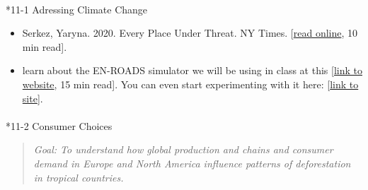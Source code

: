 \documentclass[
  10pt,
  letterpaper,
  oneside,
  open=any]{scrbook}
\makeatletter
\let\oldparagraph\paragraph
\renewcommand{\paragraph}{
    \@ifstar
      \xxxParagraphStar
      \xxxParagraphNoStar
  }
\newcommand{\xxxParagraphStar}[1]{\oldparagraph*{#1}\mbox{}}
\newcommand{\xxxParagraphNoStar}[1]{\oldparagraph{#1}\mbox{}}
\makeatother
\begin{document}

\paragraph*{11-1 Adressing Climate
Change}\label{adressing-climate-change}

\begin{itemize}
\item
  Serkez, Yaryna. 2020. Every Place Under Threat. NY Times.
  {[}\href{https://www.nytimes.com/interactive/2020/10/02/opinion/amazon-under-threat.html}{read
  online}, 10 min read{]}.
\item
  learn about the EN-ROADS simulator we will be using in class at this
  {[}\href{https://www.climateinteractive.org/en-roads/}{link to
  website}, 15 min read{]}. You can even start experimenting with it
  here:
  {[}\href{https://en-roads.climateinteractive.org/scenario.html?v=22.8.0}{link
  to site}{]}.
\end{itemize}

\paragraph*{11-2 Consumer Choices}\label{consumer-choices}

\begin{quote}
\emph{Goal: To understand how global production and chains and consumer
demand in Europe and North America influence patterns of deforestation
in tropical countries.}
\end{quote}
\end{document}
